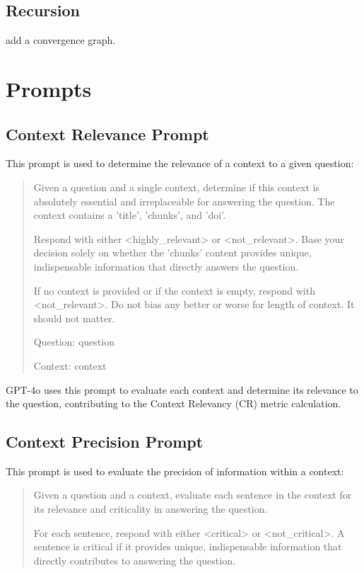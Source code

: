 \documentclass{article}
\begin{document}
\begin{multicols}{2}
\subsection{Recursion}
add a convergence graph. 
\appendix
\section{Prompts}
\label{sec:prompts}

\subsection{Context Relevance Prompt}
\label{sec:context_relevance_prompt}
This prompt is used to determine the relevance of a context to a given question:

\begin{quote}
Given a question and a single context, determine if this context is absolutely essential and irreplaceable for answering the question. The context contains a 'title', 'chunks', and 'doi'.

Respond with either \textless highly\_relevant\textgreater{} or \textless not\_relevant\textgreater{}. Base your decision solely on whether the 'chunks' content provides unique, indispensable information that directly answers the question. 

If no context is provided or if the context is empty, respond with \textless not\_relevant\textgreater{}. Do not bias any better or worse for length of context. It should not matter.

Question: {question}

Context:
{context}
\end{quote}

GPT-4o uses this prompt to evaluate each context and determine its relevance to the question, contributing to the Context Relevancy (CR) metric calculation.

\subsection{Context Precision Prompt}
\label{sec:context_precision_prompt}
This prompt is used to evaluate the precision of information within a context:

\begin{quote}
Given a question and a context, evaluate each sentence in the context for its relevance and criticality in answering the question. 

For each sentence, respond with either \textless critical\textgreater{} or \textless not\_critical\textgreater{}. 
A sentence is critical if it provides unique, indispensable information that directly contributes to answering the question.


\end{quote}
\end{multicols}
\end{document}
